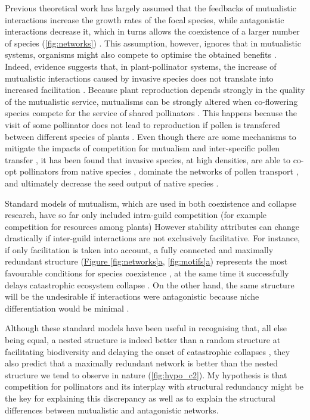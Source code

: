 \documentclass[a4paper]{article}
\begin{document}
Previous theoretical work has largely assumed that the feedbacks of mutualistic interactions increase the growth rates of the focal species, while antagonistic interactions decrease it, which in turns allows the coexistence of a larger number of species (\autoref{fig:networks}) \autocite{Moeller2004, Bastolla2009}.
This assumption, however, ignores that in mutualistic systems, organisms might also compete to optimise the obtained benefits \autocite{Levin1970}.
Indeed, evidence suggests that, in plant-pollinator systems, the increase of mutualistic interactions caused by invasive species does not translate into increased facilitation \autocite{Lopezaraiza-Mikel2007}.
Because plant reproduction depends strongly in the quality of the mutualistic service, mutualisms can be strongly altered when co-flowering species compete for the service of shared pollinators \autocite{Sargent2008, Mitchell2009}.
This happens because the visit of some pollinator does not lead to reproduction if pollen is transfered between different species of plants \autocite{Morales2008}.
Even though there are some mechanisms to mitigate the impacts of competition for mutualism and inter-specific pollen transfer \autocite{Waser1979, Ghazoul2006, Bartomeus2008a}, it has been found that invasive species, at high densities, are able to co-opt pollinators from native species \autocite{Pysek2011}, dominate the networks of pollen transport \autocite{Lopezaraiza-Mikel2007, Alarcon2010}, and ultimately decrease the seed output of native species \autocite{Munoz2008}.

Standard models of mutualism, which are used in both coexistence and collapse research, have so far only included intra-guild competition (for example competition for resources among plants) \autocite{Lever2014, Bastolla2009}
However stability attributes can change drastically if inter-guild interactions are not exclusively facilitative.
For instance, if only facilitation is taken into account, a fully connected and maximally redundant structure (\hyperref[fig:networks]{Figure \ref{fig:networks}a}, \hyperref[fig:motifs]{\ref{fig:motifs}a}) represents the most favourable conditions for species coexistence \autocite{Bastolla2009}, at the same time it successfully delays catastrophic ecosystem collapse \autocite{Lever2014}.
On the other hand, the same structure will be the undesirable if interactions were antagonistic because niche differentiation would be minimal \autocite{Stouffer2010}.

Although these standard models have been useful in recognising that, all else being equal, a nested structure is indeed better than a random structure at facilitating biodiversity and delaying the onset of catastrophic collapses \autocite{Bastolla2009, Lever2014}, they also predict that a maximally redundant network is better than the nested structure we tend to observe in nature (\autoref{fig:hypo_c2}).
My hypothesis is that competition for pollinators and its interplay with structural redundancy might be the key for explaining this discrepancy as well as to explain the structural differences between mutualistic and antagonistic networks.
\end{document}
